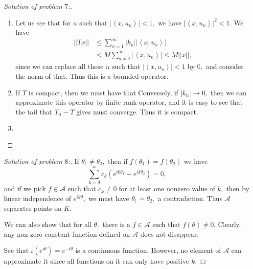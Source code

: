 \documentclass[letterpaper,11pt,twoside]{article}
\theoremstyle{proposition}
\theoremstyle{definition}
\theoremstyle{theorem}
\theoremstyle{definition}
\theoremstyle{definition}
\theoremstyle{definition}
\theoremstyle{lemma}
\theoremstyle{definition}
\theoremstyle{definition}
\theoremstyle{corollary}
\theoremstyle{definition}
\theoremstyle{definition}
\theoremstyle{definition}
\newcommand{\abs}[1]{\left \vert #1 \right \vert}
\newcommand{\gen}[1]{\left\langle #1\right\rangle}
\newcommand{\norm}[1]{\left \vert \left \vert #1 \right \vert \right \vert}
\begin{document}
	\begin{proof}[Solution of problem $7$:]
	\begin{enumerate}
		\item Let us see that for $n$ such that $\abs{\gen{ x,u_n }} < 1,$ we have $\abs{\gen{ x,u_n }}^2 < 1.$ We have 
		\begin{align*}
			\norm{Tx} &\leq \sum_{n=1}^{\infty} \abs{k_n} \abs{\gen{ x,u_n }} \\
			& \leq M \sum_{n=1}^{\infty} \abs{\gen{ x,u_n }} \leq M \norm{x},
		\end{align*}
	since we can replace all those $n$ such that $\abs{\gen{ x,u_n }}<1$ by $0,$ and consider the norm of that. Thus this is a bounded operator.
	
	\item If $T$ is compact, then we must have that 
	Conversely, if $\abs{k_n} \to 0,$ then we can approximate this operator by finite rank operator, and it is easy to see that the tail that $T_n-T$ gives 
	must converge. Thus it is compact. 
	
	\item 
	\end{enumerate}
\end{proof}
	\begin{proof}[Solution of problem $8$:]
	If $\theta_1 \neq \theta_2,$ then if $ f(\theta_1)= f(\theta_2) $ we have $$ \sum_{k=0}^{n} c_k \left( e^{ik \theta_1}-e^{ik \theta_2} \right)=0, $$ and 
	if we pick $f \in \mathcal{A}$ such that $c_k \neq 0$ for at least one nonzero value of $k,$ then by linear independence of $e^{ik\theta},$ we must have 
	$\theta_1 = \theta_2,$ a contradiction. Thus $\mathcal{A}$ separates points on $K.$
	
	We can also show that for all $\theta,$ there is a $f \in \mathcal{A}$ such that $f(\theta) \neq 0.$ Clearly, any non-zero constant function defined on 
	$\mathcal{A}$ does not disappear. 
	
	See that $ \iota(e^{i \theta})= e^{-i \theta} $ is a continuous function. However, no element of $\mathcal{A}$ can approximate it since all functions on 
	it can only have positive $k.$
\end{proof}
\end{document}
